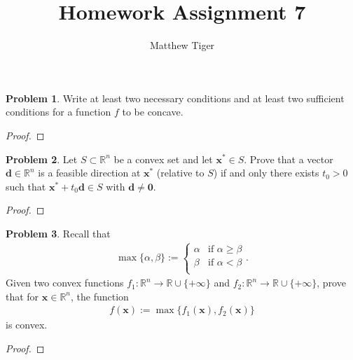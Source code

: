 \documentclass[12pt]{article}
\title{Homework Assignment 7}
\author{Matthew Tiger}
\theoremstyle{definition}
\newtheorem{problem}{Problem}
\newcommand{\vc}[1]{\boldsymbol{#1}}
\begin{document}
\maketitle


\begin{problem}
  Write at least two necessary conditions and at least two sufficient conditions for
  a function $f$ to be concave.
\end{problem}

\begin{proof}
\end{proof}
\newpage


\begin{problem}
  Let $S \subset \mathbb{R}^n$ be a convex set and let $\vc{x}^* \in S$. Prove that a vector
  $\vc{d} \in \mathbb{R}^n$ is a feasible direction at $\vc{x}^*$ (relative to $S$) if and only
  there exists $t_0 > 0$ such that $\vc{x}^* + t_0 \vc{d} \in S$ with $\vc{d} \neq \vc{0}$.
\end{problem}

\begin{proof}
\end{proof}
\newpage


\begin{problem}
  Recall that
  \begin{align*}
    \max\{\alpha, \beta\} :=
    \begin{cases}
      \alpha & \text{if $\alpha \geq \beta$} \\
      \beta & \text{if $\alpha < \beta$} \\
    \end{cases}.
  \end{align*}
  Given two convex functions $f_1: \mathbb{R}^n \to \mathbb{R} \cup \{+\infty\}$
  and $f_2: \mathbb{R}^n \to \mathbb{R} \cup \{+\infty\}$, prove that for
  $\vc{x} \in \mathbb{R}^n$, the function
  \begin{align*}
    f(\vc{x}) := \max\{f_1(\vc{x}), f_2(\vc{x})\}
  \end{align*}
  is convex.
\end{problem}

\begin{proof}
\end{proof}
\newpage
\end{document}
